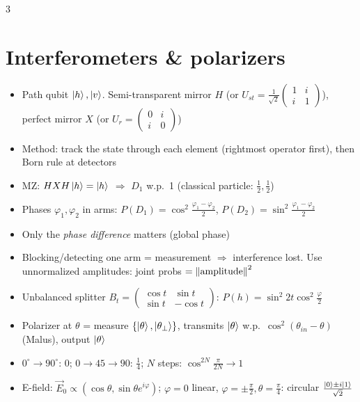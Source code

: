 \documentclass[10pt]{article}
\begin{document}
\begin{multicols*}{3}
\section{Interferometers \& polarizers}
\begin{itemize}
  \item Path qubit $\ket h,\ket v$. Semi-transparent mirror $H$ (or $U_{st}=\tfrac1{\sqrt2}\begin{pmatrix}1&i\\i&1\end{pmatrix}$), perfect mirror $X$ (or $U_r=\begin{pmatrix}0&i\\i&0\end{pmatrix}$)
  \item Method: track the state through each element (rightmost operator first), then Born rule at detectors
  \item MZ: $HXH\ket h=\ket h$ $\Rightarrow$ $D_1$ w.p.\ 1 (classical particle: $\tfrac12,\tfrac12$)
  \item Phases $\varphi_1,\varphi_2$ in arms: $P(D_1)=\cos^2\tfrac{\varphi_1-\varphi_2}2$, $P(D_2)=\sin^2\tfrac{\varphi_1-\varphi_2}2$
  \item Only the \emph{phase difference} matters (global phase)
  \item Blocking/detecting one arm = measurement $\Rightarrow$ interference lost. Use unnormalized amplitudes: joint probs $=\norm{\text{amplitude}}^2$
  \item Unbalanced splitter $B_t=\begin{pmatrix}\cos t&\sin t\\\sin t&-\cos t\end{pmatrix}$: $P(h)=\sin^2 2t\cos^2\tfrac\varphi2$
  \item Polarizer at $\theta$ = measure $\{\ket\theta,\ket{\theta_\perp}\}$, transmits $\ket\theta$ w.p.\ $\cos^2(\theta_{in}-\theta)$ (Malus), output $\ket\theta$
  \item $0^\circ\to90^\circ$: 0; $0\to45\to90$: $\tfrac14$; $N$ steps: $\cos^{2N}\tfrac\pi{2N}\to1$
  \item E-field: $\vec E_0\propto(\cos\theta,\sin\theta e^{i\varphi})$; $\varphi=0$ linear, $\varphi=\pm\tfrac\pi2,\theta=\tfrac\pi4$: circular $\tfrac{\ket0\pm i\ket1}{\sqrt2}$
\end{itemize}


\end{multicols*}
\end{document}
